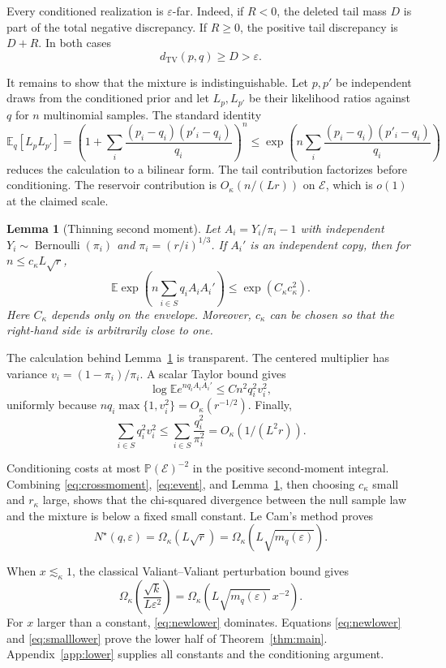 \documentclass{article}
\newtheorem{lemma}{Lemma}
\newcommand{\E}{\mathbb E}
\newcommand{\Pp}{\mathbb P}
\newcommand{\TV}{d_{\mathrm{TV}}}
\newcommand{\1}{\mathbf 1}
\newcommand{\Nstar}{N^\star}
\begin{document}
Every conditioned realization is $\varepsilon$-far. Indeed, if $R<0$, the deleted tail mass $D$ is part of the total negative discrepancy. If $R\geq0$, the positive tail discrepancy is $D+R$. In both cases \[ \TV(p,q)\geq D>\varepsilon. \tag{17}\label{eq:far} \]

It remains to show that the mixture is indistinguishable. Let $p,p'$ be independent draws from the conditioned prior and let $L_p,L_{p'}$ be their likelihood ratios against $q$ for $n$ multinomial samples. The standard identity \[ \E_q[L_pL_{p'}] =\left(1+\sum_i\frac{(p_i-q_i)(p'_i-q_i)}{q_i}\right)^n \leq \exp\left(n\sum_i\frac{(p_i-q_i)(p'_i-q_i)}{q_i}\right) \tag{18}\label{eq:crossmoment} \] reduces the calculation to a bilinear form. The tail contribution factorizes before conditioning. The reservoir contribution is $O_\kappa(n/(Lr))$ on $\mathcal E$, which is $o(1)$ at the claimed scale.

\begin{lemma}[Thinning second moment]
\label{lem:thinning}
Let $A_i=Y_i/\pi_i-1$ with independent $Y_i\sim\operatorname{Bernoulli}(\pi_i)$ and $\pi_i=(r/i)^{1/3}$. If $A_i'$ is an independent copy, then for $n\leq c_\kappa L\sqrt r$, \[ \E\exp\left(n\sum_{i\in S}q_iA_iA_i'\right) \leq \exp(C_\kappa c_\kappa^2). \tag{19}\label{eq:thinningmoment} \] Here $C_\kappa$ depends only on the envelope. Moreover, $c_\kappa$ can be chosen so that the right-hand side is arbitrarily close to one.
\end{lemma}

The calculation behind Lemma~\ref{lem:thinning} is transparent. The centered multiplier has variance $v_i=(1-\pi_i)/\pi_i$. A scalar Taylor bound gives \[ \log\E e^{nq_iA_iA_i'}\leq Cn^2q_i^2v_i^2, \] uniformly because $nq_i\max\{1,v_i^2\}=O_\kappa(r^{-1/2})$. Finally, \[ \sum_{i\in S}q_i^2v_i^2 \leq \sum_{i\in S}\frac{q_i^2}{\pi_i^2} =O_\kappa(1/(L^2r)). \tag{20}\label{eq:secondcost} \]

Conditioning costs at most $\Pp(\mathcal E)^{-2}$ in the positive second-moment integral. Combining \eqref{eq:crossmoment}, \eqref{eq:event}, and Lemma~\ref{lem:thinning}, then choosing $c_\kappa$ small and $r_\kappa$ large, shows that the chi-squared divergence between the null sample law and the mixture is below a fixed small constant. Le Cam's method proves \[ \Nstar(q,\varepsilon)=\Omega_\kappa(L\sqrt r) =\Omega_\kappa(L\sqrt{m_q(\varepsilon)}). \tag{21}\label{eq:newlower} \]

When $x\lesssim_\kappa1$, the classical Valiant--Valiant perturbation bound gives \[ \Omega_\kappa\left(\frac{\sqrt{k}}{L\varepsilon^2}\right) =\Omega_\kappa\left(L\sqrt{m_q(\varepsilon)}\,x^{-2}\right). \tag{22}\label{eq:smalllower} \] For $x$ larger than a constant, \eqref{eq:newlower} dominates. Equations \eqref{eq:newlower} and \eqref{eq:smalllower} prove the lower half of Theorem~\ref{thm:main}. Appendix~\ref{app:lower} supplies all constants and the conditioning argument.
\end{document}
